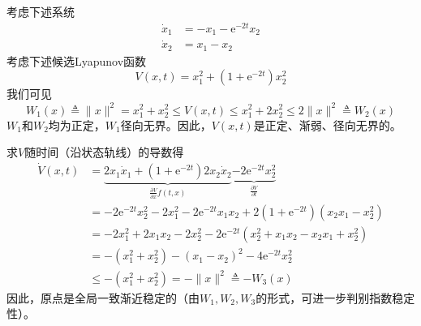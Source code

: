 \begin{example}
  考虑下述系统
  \begin{align*}
    \dot{x}_1 & = - x_1 - \mathrm{e}^{- 2 t} x_2\\
    \dot{x}_2 & = x_1 - x_2
  \end{align*}
  考虑下述候选Lyapunov函数
  \[ V (x, t) = x^2_1 + (1 + \mathrm{e}^{- 2 t}) x^2_2 \]
  我们可见
  \[ W_1 (x)\triangleq \| x \|^2 = x^2_1 + x^2_2 \leq V (x, t) \leq x^2_1 + 2
     x^2_2  \leq 2 \| x \|^2 \triangleq W_2 (x) \]
  $W_1$和$W_2$均为正定，$W_1$径向无界。因此，$V (x, t)$是正定、渐弱、径向无界的。
  
  求$V$随时间（沿状态轨线）的导数得
  \begin{align*}
    \dot{V} (x, t) & =  \underbrace{2 x_1 \dot{ x}_1 + (1 + \mathrm{e}^{- 2 t}) 2 x_2 \dot{x}_2}_{\frac{\partial V}{\partial x} f (t, x)}  \underbrace{-2 \mathrm{e}^{- 2 t} x^2_2}_{\frac{\partial V}{\partial t}}\\
    &=-2\mathrm{e}^{-2t}x_{2}^{2}-2x_{1}^{2}-2\mathrm{e}^{-2t}x_{1}x_{2}+2(1+\mathrm{e}^{-2t})(x_{2}x_{1}-x_{2}^{2})\\
    &=-2x_{1}^{2}+2x_{1}x_{2}-2x_{2}^{2}-2\mathrm{e}^{-2t}(x_{2}^{2}+x_{1}x_{2}-x_{2}x_{1}+x_{2}^{2})\\
    & =  - (x^2_1 + x^2_2) - (x_1 - x_2)^2 - 4 \mathrm{e}^{- 2 t} x^2_2\\
    & \leq  - (x^2_1 + x^2_2) = - \| x \|^2\triangleq  - W_3 (x)
  \end{align*}
  因此，原点是全局一致渐近稳定的（由$W_1,W_2,W_3$的形式，可进一步判别指数稳定性）。
\end{example}
